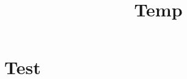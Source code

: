 \documentclass[a4paper,10pt]{article}
\title{Temp}
\begin{document}
\maketitle
\section{Test}
\end{document}
